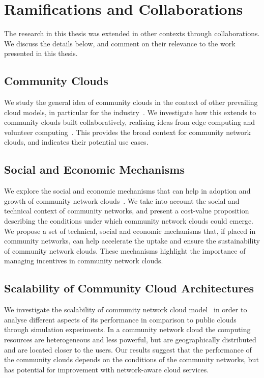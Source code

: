 

\section{Ramifications and Collaborations}
\label{sec__collaborations}

The research in this thesis was extended in other contexts through collaborations.
We discuss the details below, and comment on their relevance to the work presented in this thesis.

\subsection{Community Clouds}
\label{sec__community_clouds_background}

We study the general idea of community clouds 
in the context of other prevailing cloud models, in particular for the industry~\cite{Khan2015CommunityClouds}.
We investigate how this extends to community clouds built collaboratively,
realising ideas from edge computing and volunteer computing~\cite{Khan2015Current}.
This provides the broad context for community network clouds, 
and indicates their potential use cases.

\subsection{Social and Economic Mechanisms}
\label{sec__economic_mechanisms}

We explore the social and economic mechanisms that can help in adoption and growth of community network clouds~\cite{Khan2014Macroeconomic, Khan2014Sparks}. 
We take into account the social and technical context of community networks,
and present a cost-value proposition describing the conditions under which community network clouds could emerge. 
We propose a set of technical, social and economic mechanisms that, 
if placed in community networks, 
can help accelerate the uptake and ensure the sustainability of community network clouds.
These mechanisms highlight the importance of managing incentives in community network clouds.

\subsection{Scalability of Community Cloud Architectures}
\label{sec__scalability_background}

We investigate the scalability of community network cloud model~\cite{Khan2013Clouds}
in order to analyse different aspects of its performance 
in comparison to public clouds through simulation experiments.
In a community network cloud the computing resources are heterogeneous and less powerful, 
but are geographically distributed and are located closer to the users.
Our results suggest that the performance of the community clouds 
depends on the conditions of the community networks, 
but has potential for improvement with network-aware cloud services. 

